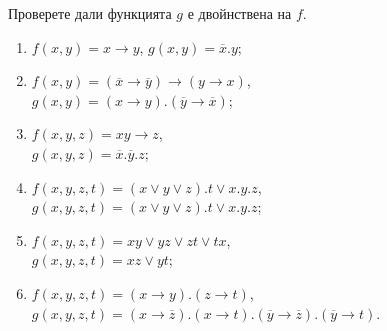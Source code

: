 \begin{problem}
  Проверете дали функцията $g$ е двойнствена на $f$.
  \begin{enumerate}[1)]
  \item
    $f(x,y) = x\rightarrow y$, $g(x,y) = \overline{x}.y$;
  \item
    $f(x,y) = (\overline{x}\rightarrow\overline{y})\rightarrow(y\rightarrow x)$, \\
    $g(x,y) = (x\rightarrow y).(\overline{y}\rightarrow\overline{x})$;
  \item
    $f(x,y,z) = xy \rightarrow z$,\\
    $g(x,y,z) = \overline{x}.\overline{y}.z$;
  \item
    $f(x,y,z,t) = (x\vee y\vee z).t\vee x.y.z$, \\
    $g(x,y,z,t) = (x\vee y\vee z).t\vee x.y.z$;
  \item
    $f(x,y,z,t) = xy\vee yz\vee zt\vee tx$, \\
    $g(x,y,z,t) = xz\vee yt$;
  \item
    $f(x,y,z,t) = (x\rightarrow y).(z\rightarrow t)$, \\
    $g(x,y,z,t) = (x\rightarrow\overline{z}).(x\rightarrow t).(\overline{y}\rightarrow\overline{z}).(\overline{y}\rightarrow t)$.
  \end{enumerate}
\end{problem}

